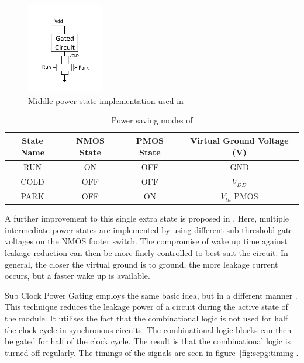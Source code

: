 \begin{figure}
\centering
\includegraphics[width=0.3\textwidth]{Figures/powergating_kim.pdf}
\caption{Middle power state implementation used in \cite{kim2004experimental}}
\label{fig:kim}
\end{figure}

\begin{table}
\caption{Power saving modes of \cite{kim2004experimental}}
\label{tab:kim}
\centering
\begin{tabular}{|c|c|c|c|}\hline
State Name & NMOS State & PMOS State & Virtual Ground Voltage (V)\\ \hline
RUN  & ON   & OFF  & GND \\
COLD & OFF  & OFF  & $V_{DD}$ \\
PARK & OFF  & ON   & $V_{th}$ PMOS \\ \hline
\end{tabular}
\end{table}

A further improvement to this single extra state is proposed in \cite{singh2007enhanced}. 
Here, multiple intermediate power states are implemented by using different sub-threshold gate voltages on the NMOS footer switch. 
The compromise of wake up time against leakage reduction can then be more finely controlled to best suit the circuit.
In general, the closer the virtual ground is to ground, the more leakage current occurs, but a faster wake up is available. 

Sub Clock Power Gating employs the same basic idea, but in a different manner \cite{mistry2011sub}.
This technique reduces the leakage power of a circuit during the active state of the module.
It utilises the fact that the combinational logic is not used for half the clock cycle in synchronous circuits.
The combinational logic blocks can then be gated for half of the clock cycle.
The result is that the combinational logic is turned off regularly. 
The timings of the signals are seen in figure~\ref{fig:scpg:timing}.

